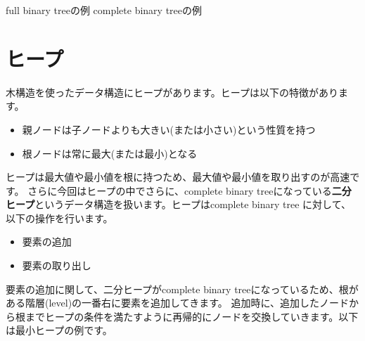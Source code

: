\documentclass{jlreq}
\begin{document}
\hspace{1.5cm} full binary treeの例 \hspace{4.5cm} complete binary treeの例

\newpage

\section{ヒープ}
木構造を使ったデータ構造にヒープがあります。ヒープは以下の特徴があります。

\begin{itemize}
	\item 親ノードは子ノードよりも大きい(または小さい)という性質を持つ
	\item 根ノードは常に最大(または最小)となる
\end{itemize}

ヒープは最大値や最小値を根に持つため、最大値や最小値を取り出すのが高速です。
さらに今回はヒープの中でさらに、complete binary treeになっている\textbf{二分ヒープ}というデータ構造を扱います。ヒープはcomplete binary tree
に対して、以下の操作を行います。

\begin{itemize}
	\item 要素の追加
	\item 要素の取り出し
\end{itemize}

要素の追加に関して、二分ヒープがcomplete binary treeになっているため、根がある階層(level)の一番右に要素を追加してきます。
追加時に、追加したノードから根までヒープの条件を満たすように再帰的にノードを交換していきます。以下は最小ヒープの例です。
\end{document}
